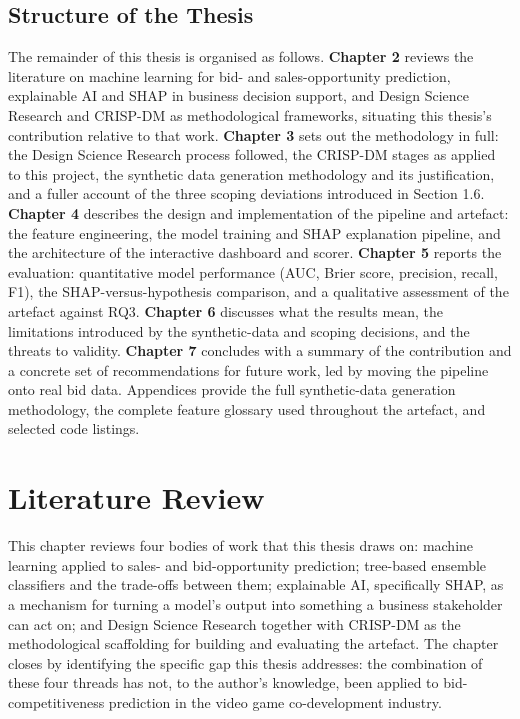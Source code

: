 \documentclass[12pt,oneside]{report}
\begin{document}
\hypertarget{structure-of-the-thesis}{%
\section{Structure of the Thesis}\label{structure-of-the-thesis}}

The remainder of this thesis is organised as follows. \textbf{Chapter 2}
reviews the literature on machine learning for bid- and
sales-opportunity prediction, explainable AI and SHAP in business
decision support, and Design Science Research and CRISP-DM as
methodological frameworks, situating this thesis's contribution relative
to that work. \textbf{Chapter 3} sets out the methodology in full: the
Design Science Research process followed, the CRISP-DM stages as applied
to this project, the synthetic data generation methodology and its
justification, and a fuller account of the three scoping deviations
introduced in Section 1.6. \textbf{Chapter 4} describes the design and
implementation of the pipeline and artefact: the feature engineering,
the model training and SHAP explanation pipeline, and the architecture
of the interactive dashboard and scorer. \textbf{Chapter 5} reports the
evaluation: quantitative model performance (AUC, Brier score, precision,
recall, F1), the SHAP-versus-hypothesis comparison, and a qualitative
assessment of the artefact against RQ3. \textbf{Chapter 6} discusses
what the results mean, the limitations introduced by the synthetic-data
and scoping decisions, and the threats to validity. \textbf{Chapter 7}
concludes with a summary of the contribution and a concrete set of
recommendations for future work, led by moving the pipeline onto real
bid data. Appendices provide the full synthetic-data generation
methodology, the complete feature glossary used throughout the artefact,
and selected code listings.

\hypertarget{literature-review}{%
\chapter{Literature Review}\label{literature-review}}

This chapter reviews four bodies of work that this thesis draws on:
machine learning applied to sales- and bid-opportunity prediction;
tree-based ensemble classifiers and the trade-offs between them;
explainable AI, specifically SHAP, as a mechanism for turning a model's
output into something a business stakeholder can act on; and Design
Science Research together with CRISP-DM as the methodological
scaffolding for building and evaluating the artefact. The chapter closes
by identifying the specific gap this thesis addresses: the combination
of these four threads has not, to the author's knowledge, been applied
to bid-competitiveness prediction in the video game co-development
industry.
\end{document}
